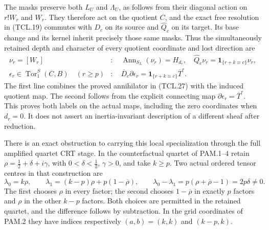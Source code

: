 The masks preserve both \(L_U\) and \(\Lambda_U\), as follows
from their diagonal action on \(r!W_r\) and \(W_r\). They
therefore act on the quotient \(C\), and the exact free resolution
in (TCL.19) commutes with \(D_c\) on its source and
\(\widehat Q_c\) on its target. Its base change and its kernel
inherit precisely those same masks. Thus the simultaneously retained
depth and character of every quotient coordinate and lost direction are
\[
 \begin{split}
 \nu_r=[W_r]&:\quad
       \operatorname{Ann}_{S_L}(\nu_r)=H_{d_r},\quad
       \widehat Q_c\nu_r=\mathbf 1_{\{r+k\equiv c\}}\nu_r,\\
 \epsilon_r\in\operatorname{Tor}_1^S(C,B)\quad(r\geq p)
     &:\quad \overline D_c\partial\epsilon_r
        =\mathbf 1_{\{r+k\equiv c\}}\overline T^r.
 \end{split}
 \tag{TCL.32}\label{CFStage:eq:tcl-two-labels}
\]
The first line combines the proved annihilator in (TCL.27) with
the induced quotient map. The second follows from the explicit
connecting map \(\partial\epsilon_r=\overline T^r\).
This proves both labels on the actual maps, including the zero
coordinates when \(d_r=0\). It does not assert an inertia-invariant
description of a different sheaf after reduction.

There is an exact obstruction to carrying this local specialization
through the full amplified quartet CRT stage. In the counterfactual
quartet of PAM.1--4 retain
\(\rho=\tfrac12+\delta+i\gamma\), with
\(0<\delta<\tfrac12\), \(\gamma>0\), and take \(k\geq p\).
Two actual ordered tensor centres in that construction are
\[
 \lambda_0=k\rho,\qquad
 \lambda_1=(k-p)\rho+p(1-\overline\rho),\qquad
 \lambda_0-\lambda_1=p(\rho+\overline\rho-1)=2p\delta\ne0.
 \tag{TCL.33}\label{CFStage:eq:tcl-crt-centres}
\]
The first chooses \(\rho\) in every factor; the second chooses
\(1-\overline\rho\) in exactly \(p\) factors and \(\rho\)
in the other \(k-p\) factors. Both choices are permitted in the
retained quartet, and the difference follows by subtraction.
In the grid coordinates of PAM.2 they have indices respectively
\((a,b)=(k,k)\) and \((k-p,k)\).

